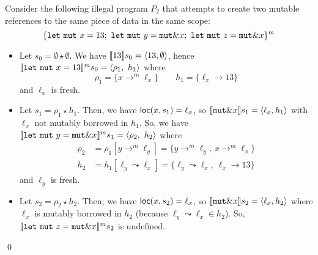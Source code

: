 \begin{example}
  Consider the following illegal program $P_2$
  that attempts to create two mutable references
  to the same piece of data in the same scope:
  \[
    \{
      \mathtt{let\ mut}\ x = 13;\
      \mathtt{let\ mut}\ y = \mathtt{mut}\borrow x;\
      \mathtt{let\ mut}\ z = \mathtt{mut}\borrow x
    \}^m
  \]
  \begin{itemize}
    \item Let $s_0=\emptyset \star \emptyset$.
    We have $\den[13]{s_0} = \langle 13,\emptyset\rangle$, hence
    $\denl[\mathtt{let\ mut}\ x = 13]{m}{s_0} =
    \langle \rho_1,\ h_1\rangle$ where
    \[\rho_1=\{x\to^m\ell_x\} \qquad
    h_1 = \{\ell_x\to 13\}\]
    and $\ell_x$ is fresh.
    \item Let $s_1 = \rho_1 \star h_1$.
    Then, we have $\loc(x,s_1) = \ell_x$, so
    $\den[\mathtt{mut}\borrow x]{s_1} = \langle \ell_x,h_1\rangle$
    with $\ell_x$ not mutably borrowed in $h_1$.
    So, we have
    $\denl[\mathtt{let\ mut}\ y = \mathtt{mut}\borrow x]{m}{s_1} =
    \langle \rho_2,\ h_2\rangle$
    where
    \begin{align*}
      \rho_2 & = \rho_1[y\to^m\ell_y] = \{y\to^m\ell_y,\ x\to^m\ell_x\}\\
      h_2 & = h_1[\ell_y\leadsto \ell_x] =
      \{\ell_y\leadsto \ell_x,\ \ell_x\to 13\}
    \end{align*}
    and $\ell_y$ is fresh.
    \item Let $s_2 = \rho_2 \star h_2$.
    Then, we have $\loc(x,s_2) = \ell_x$, so
    $\den[\mathtt{mut}\borrow x]{s_2} = \langle \ell_x,h_2\rangle$
    where $\ell_x$ is mutably borrowed in $h_2$
    (because $\ell_y\leadsto \ell_x \in h_2$).
    So, $\denl[\mathtt{let\ mut}\ z = \mathtt{mut}\borrow x]{m}{s_2}$
    is undefined.
  \end{itemize}
  \qed
\end{example}

